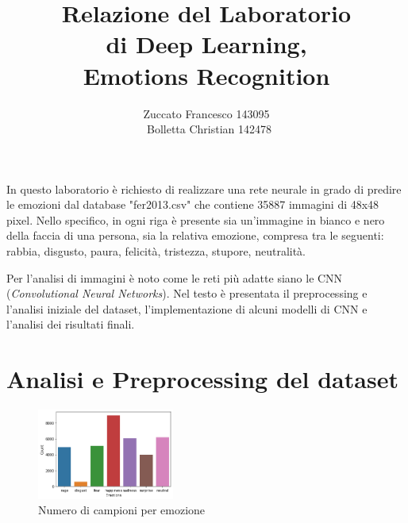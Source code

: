 \documentclass[target=mst]{thud}
\title{Relazione del Laboratorio \\ di Deep Learning, \\ Emotions Recognition}
\author{Zuccato Francesco 143095 \\ \ Bolletta Christian 142478}
\begin{document}
\maketitle

\abstract
In questo laboratorio è richiesto di realizzare una rete neurale in grado di predire le emozioni dal database "fer2013.csv" che contiene 35887 immagini di 48x48 pixel.
Nello specifico, in ogni riga è presente sia un'immagine in bianco e nero della faccia di una persona, sia la relativa emozione, compresa tra le seguenti: rabbia, disgusto, paura, felicità,  tristezza, stupore, neutralità.

Per l'analisi di immagini è noto come le reti più adatte siano le CNN (\textit{Convolutional Neural Networks}).
Nel testo è presentata il preprocessing e l'analisi iniziale del dataset, l'implementazione di alcuni modelli di CNN e l'analisi dei risultati finali.

\tableofcontents



\mainmatter


\chapter{Analisi e Preprocessing del dataset}


\begin{figure}
  \label{EmotionsCount}
  \centering
  \includegraphics[width=0.4\textwidth]{EmotionsCount.png}
  \caption{Numero di campioni per emozione}
\end{figure}
\end{document}
